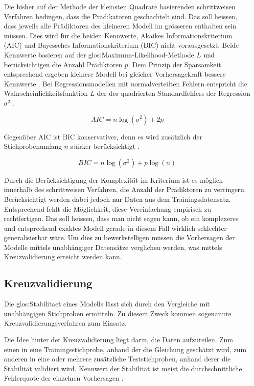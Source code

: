 Die bisher auf der Methode der kleinsten Quadrate basierenden schrittweisen Verfahren bedingen, dass die Prädikatoren geschachtelt sind. 
Das soll heissen, dass jeweils alle Prädiktoren des kleineren Modell im grösseren enthalten sein müssen. 
Dies wird für die  beiden Kennwerte, Akaikes Informationskriterium (AIC) und  Bayessches Informationskriterium (BIC) nicht vorausgesetzt. 
Beide Kennwerte basieren auf der \Gls{glos:Maximum-Likelihood-Methode} $L$ und  berücksichtigen die Anzahl Prädiktoren $p$. 
Dem Prinzip der Sparsamkeit entsprechend ergeben kleinere Modell bei gleicher Vorhersagekraft bessere Kennwerte \cite[p. 509]{jacob2003applied}. 
Bei Regressionsmodellen mit normalverteilten Fehlern entspricht die Wahrscheinlichkeitsfunktion $L$ der des quadrierten Standardfehlers der Regression $\sigma^2$ \cite[p. 169]{weakliem2004introduction}. 

\begin{equation}
AIC = n \log(\sigma^2) + 2p
\tag{AIC}
\end{equation}

Gegenüber AIC ist BIC konservativer, denn es wird zusätzlich der Stichprobenumfang $n$ stärker berücksichtigt \cite[p. 169]{weakliem2004introduction}. 

\begin{equation}
BIC = n\log(\sigma^2) + p\log(n)
\tag{BIC}
\end{equation}

Durch die Berücksichtigung der Komplexität im Kriterium ist es möglich innerhalb des schrittweisen Verfahren, die Anzahl der Prädiktoren zu verringern.  Berücksichtigt werden dabei jedoch nur Daten aus dem Trainingsdatensatz. Entsprechend fehlt die Möglichkeit, diese Vereinfachung empirisch zu rechtfertigen. Das soll heissen, dass man nicht sagen kann, ob ein komplexeres und entsprechend exaktes Modell gerade in diesem Fall wirklich schlechter generalisierbar wäre. Um dies zu bewerkstelligen müssen die Vorhersagen der Modelle mittels unabhängiger Datensätze verglichen werden, was mittels Kreuzvalidierung erreicht werden kann. 

\subsection{Kreuzvalidierung}
Die \Gls{glos:Stabilitaet} eines Modells lässt sich durch den Vergleiche mit unabhängigen Stichproben ermitteln.
Zu diesem Zweck kommen sogenannte Kreuzvalidierungsverfahren zum Einsatz.

Die Idee hinter der Kreuzvalidierung liegt darin, die Daten aufzuteilen. Zum einen in eine Trainingsstichprobe, anhand der die Gleichung geschätzt wird, zum anderen in eine oder mehrere zusätzliche Teststichproben, anhand derer die Stabilität validiert wird. Kennwert der Stabilität ist meist die durchschnittliche Fehlerquote der einzelnen Vorhersagen \cite[p. 3]{arlot2010survey}. 

